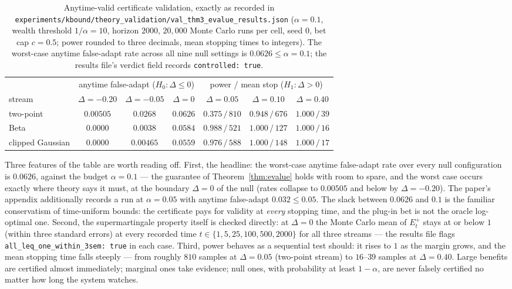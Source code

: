 \begin{table}[t]\centering\small
\begin{tabular}{lcccccc}
\toprule
& \multicolumn{3}{c}{anytime false-adapt ($H_0:\Delta\le0$)}
& \multicolumn{3}{c}{power / mean stop ($H_1:\Delta>0$)}\\
\cmidrule(lr){2-4}\cmidrule(lr){5-7}
stream & $\Delta=-0.20$ & $\Delta=-0.05$ & $\Delta=0$
& $\Delta=0.05$ & $\Delta=0.10$ & $\Delta=0.40$\\
\midrule
two-point        & $0.00505$ & $0.0268$  & $0.0626$ & $0.375\,/\,810$ & $0.948\,/\,676$ & $1.000\,/\,39$\\
Beta             & $0.0000$  & $0.0038$  & $0.0584$ & $0.988\,/\,521$ & $1.000\,/\,127$ & $1.000\,/\,16$\\
clipped Gaussian & $0.0000$  & $0.00465$ & $0.0559$ & $0.976\,/\,588$ & $1.000\,/\,148$ & $1.000\,/\,17$\\
\bottomrule
\end{tabular}
\caption{Anytime-valid certificate validation, exactly as recorded in
\texttt{experiments/kbound/theory\_validation/val\_thm3\_evalue\_results.json}
($\alpha=0.1$, wealth threshold $1/\alpha=10$, horizon $2000$, $20{,}000$ Monte Carlo
runs per cell, seed $0$, bet cap $c=0.5$; power rounded to three decimals, mean
stopping times to integers). The worst-case anytime false-adapt rate across all nine
null settings is $0.0626\le\alpha=0.1$; the results file's verdict field records
\texttt{controlled:\,true}.}
\label{sec:t2-tab-evalue}
\end{table}

Three features of the table are worth reading off. First, the headline: the worst-case
anytime false-adapt rate over every null configuration is $\mathbf{0.0626}$, against
the budget $\alpha=0.1$ --- the guarantee of Theorem~\ref{thm:evalue} holds with room
to spare, and the worst case occurs exactly where theory says it must, at the boundary
$\Delta=0$ of the null (rates collapse to $0.00505$ and below by $\Delta=-0.20$). The
paper's appendix additionally records a run at $\alpha=0.05$ with anytime false-adapt
$0.032\le0.05$. The slack between $0.0626$ and $0.1$ is the familiar conservatism of
time-uniform bounds: the certificate pays for validity at \emph{every} stopping time,
and the plug-in bet is not the oracle log-optimal one. Second, the supermartingale
property itself is checked directly: at $\Delta=0$ the Monte Carlo mean of $E^+_t$
stays at or below $1$ (within three standard errors) at every recorded time
$t\in\{1,5,25,100,500,2000\}$ for all three streams --- the results file flags
\texttt{all\_leq\_one\_within\_3sem:\,true} in each case. Third, power behaves as a
sequential test should: it rises to $1$ as the margin grows, and the mean stopping time
falls steeply --- from roughly $810$ samples at $\Delta=0.05$ (two-point stream) to
$16$--$39$ samples at $\Delta=0.40$. Large benefits are certified almost immediately;
marginal ones take evidence; null ones, with probability at least $1-\alpha$, are never
falsely certified no matter how long the system watches.

